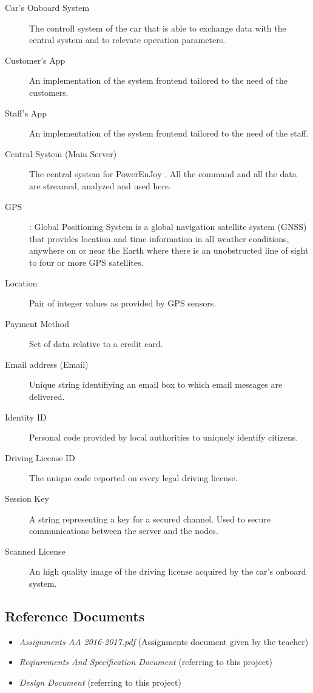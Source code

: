 \documentclass[11pt]{article} %
\newcommand{\pe}{PowerEnJoy }
\begin{document}
\begin{description}
	\item[Car's Onboard System] The controll system of the car that is able to exchange data with the central system and to relevate operation parameters.
	\item[Customer's App] An implementation of the system frontend tailored to the need of the customers.
	\item[Staff's App] An implementation of the system frontend tailored to the need of the staff.
	\item[Central System (Main Server)] The central system for \pe. All the command and all the data are streamed, analyzed and used here.
	\item[GPS]: Global Positioning System is a global navigation satellite system (GNSS) that provides location and time information in all weather conditions, anywhere on or near the Earth where there is an unobstructed line of sight to four or more GPS satellites.
	\item[Location] Pair of integer values as provided by GPS sensors.
	\item[Payment Method] Set of data relative to a credit card.
	\item[Email address (Email)] Unique string identifiying an email box to which email messages are delivered.
	\item[Identity ID] Personal code provided by local authorities to uniquely identify citizens.
	\item[Driving License ID] The unique code reported on every legal driving license.
	\item[Session Key]  A string representing a key for a secured channel. Used to secure communications between the server and the nodes.
	\item[Scanned License] An high quality image of the driving license acquired by the car's onboard system.
  \end{description}

\subsection{Reference Documents}
\begin{itemize}
	\item \textit{Assignments AA 2016-2017.pdf} (Assignments document given by the teacher)
	\item \textit{Reqiurements And Specification Document} (referring to this project)
	\item \textit{Design Document} (referring to this project)
  \end{itemize}
\end{document}
